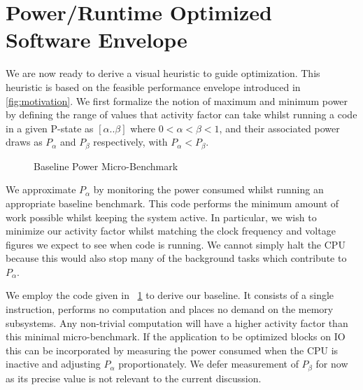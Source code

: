 \section{Power/Runtime Optimized Software Envelope}
We are now ready to derive a visual heuristic to guide optimization. This heuristic is based on the feasible performance envelope introduced in \autoref{fig:motivation}. We first formalize the notion of maximum and minimum power by defining the range of values that activity factor can take whilst running a code in a given P-state as $[\alpha  .. \beta]$ where $0 < \alpha < \beta < 1$, and their associated power draws as $P_{\alpha}$ and $P_{\beta}$ respectively, with $P_{\alpha} < P_{\beta}$. 

\begin{figure}[ht]                                                               
\centering                                                                      
\lstset{basicstyle=\ttfamily\footnotesize\bfseries, frame=tb} %
              
\caption{Baseline Power Micro-Benchmark}                            
\label{fig:microbench}                                                           
\end{figure}  

We approximate $P_{\alpha}$ by monitoring the power consumed whilst running an appropriate baseline benchmark. This code performs the minimum amount of work possible whilst keeping the system active. In particular, we wish to minimize our activity factor whilst matching the clock frequency and voltage figures we expect to see when code is running. We cannot simply halt the CPU because this would also stop many of the background tasks which contribute to $P_{\alpha}$.

We employ the code given in \figurename~\ref{fig:microbench} to derive our baseline.  It consists of a single instruction, performs no computation and places no demand on the memory subsystems. Any non-trivial computation will have a higher activity factor than this minimal micro-benchmark. If the application to be optimized blocks on IO this can be incorporated by measuring the power consumed when the CPU is inactive and adjusting $P_\alpha$ proportionately. We defer measurement of $P_{\beta}$ for now as its precise value is not relevant to the current discussion. 

